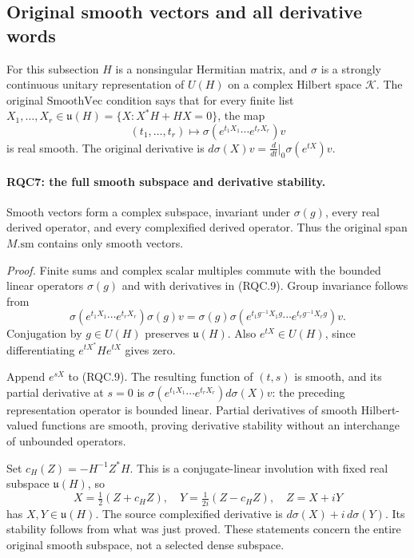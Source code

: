 \documentclass[11pt,a4paper]{article}
\numberwithin{equation}{section}
\theoremstyle{remark}\newtheorem{remark}[theorem]{Remark}
\begin{document}
\subsection{Original smooth vectors and all derivative words}

For this subsection \(H\) is a nonsingular Hermitian matrix, and
\(\sigma\) is a strongly continuous unitary representation of
\(U(H)\) on a complex Hilbert space \(\mathcal K\).
The original \(\mathrm{SmoothVec}\) condition says that for every
finite list \(X_1,\ldots,X_r\in
\mathfrak u(H)=\{X:X^*H+HX=0\}\), the map
\[
 (t_1,\ldots,t_r)\longmapsto
 \sigma(e^{t_1X_1}\cdots e^{t_rX_r})v
 \tag{RQC.9}
\]
is real smooth.  The original derivative is
\(d\sigma(X)v=\frac{d}{dt}|_0\sigma(e^{tX})v\).

\paragraph{RQC7: the full smooth subspace and derivative stability.}
\label{claim:RQC7}
Smooth vectors form a complex subspace, invariant under
\(\sigma(g)\), every real derived operator, and every complexified
derived operator.  Thus the original span \(M.\mathrm{sm}\)
contains only smooth vectors.

\emph{Proof.}
Finite sums and complex scalar multiples commute with the bounded
linear operators \(\sigma(g)\) and with derivatives in (RQC.9).
Group invariance follows from
\[
 \sigma(e^{t_1X_1}\cdots e^{t_rX_r})\sigma(g)v
 =\sigma(g)\sigma(e^{t_1g^{-1}X_1g}\cdots
                       e^{t_rg^{-1}X_rg})v.
 \tag{RQC.10}
\]
Conjugation by \(g\in U(H)\) preserves \(\mathfrak u(H)\).
Also \(e^{tX}\in U(H)\), since differentiating
\(e^{tX^*}He^{tX}\) gives zero.

Append \(e^{sX}\) to (RQC.9).  The resulting function of
\((t,s)\) is smooth, and its partial derivative at \(s=0\) is
\(\sigma(e^{t_1X_1}\cdots e^{t_rX_r})d\sigma(X)v\):
the preceding representation operator is bounded linear.
Partial derivatives of smooth Hilbert-valued functions are smooth,
proving derivative stability without an interchange of unbounded
operators.

Set \(c_H(Z)=-H^{-1}Z^*H\).  This is a conjugate-linear involution
with fixed real subspace \(\mathfrak u(H)\), so
\[
 X=\tfrac12(Z+c_HZ),\quad
 Y=\tfrac1{2i}(Z-c_HZ),\quad Z=X+iY
 \tag{RQC.11}
\]
has \(X,Y\in\mathfrak u(H)\).
The source complexified derivative is \(d\sigma(X)+i\,d\sigma(Y)\).
Its stability follows from what was just proved.  These statements
concern the entire original smooth subspace, not a selected dense
subspace.
\end{document}

